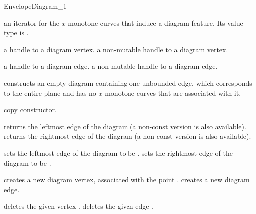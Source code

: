 \begin{ccRefConcept}{EnvelopeDiagram_1}

{an iterator for the $x$-monotone curves that induce a diagram feature.
 Its value-type is .}

\ccGlue
{}

{a handle to a diagram vertex.}
\ccGlue
{}
{a non-mutable handle to a diagram vertex.}

{a handle to a diagram edge.}
\ccGlue
{}
{a non-mutable handle to a diagram edge.}

\ccCreation
{}

    {constructs an empty diagram containing one unbounded edge,
     which corresponds to the entire plane and has no $x$-monotone
     curves that are associated with it.}
    
    {copy constructor.}
        
\ccAccessFunctions

    {returns the leftmost edge of the diagram (a non-const version is also available).}
\ccGlue
{}
    {returns the rightmost edge of the diagram (a non-const version is also available).}

\ccModifiers

    {sets the leftmost edge of the diagram to be .}
\ccGlue
{}
    {sets the rightmost edge of the diagram to be .}

    {creates a new diagram vertex, associated with the point .}
\ccGlue
{}
    {creates a new diagram edge.}
    
    {deletes the given vertex .}
\ccGlue
{}
    {deletes the given edge .}

\ccSeeAlso
     \\
     \\

\end{ccRefConcept}

\ccRefPageEnd

